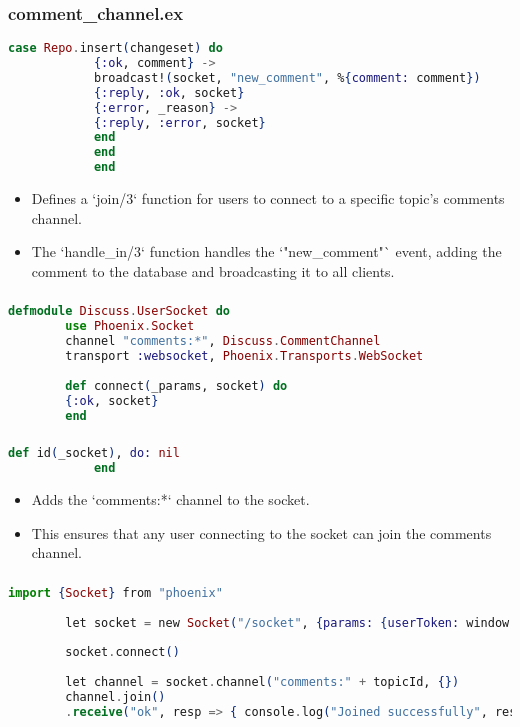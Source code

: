 \documentclass[aspectratio=169, table]{beamer}
\begin{document}
	\begin{frame}[fragile]
		\frametitle{comment\_channel.ex}
		\begin{lstlisting}[language=Elixir]
			case Repo.insert(changeset) do
			{:ok, comment} ->
			broadcast!(socket, "new_comment", %{comment: comment})
			{:reply, :ok, socket}
			{:error, _reason} ->
			{:reply, :error, socket}
			end
			end
			end
		\end{lstlisting}
		\begin{itemize}
			\item Defines a `join/3` function for users to connect to a specific topic's comments channel.
			\item The `handle\_in/3` function handles the `"new\_comment"` event, adding the comment to the database and broadcasting it to all clients.
		\end{itemize}
	\end{frame}
	
	\begin{frame}[fragile]
	\frametitle{}
	\begin{lstlisting}[language=Elixir]
		defmodule Discuss.UserSocket do
		use Phoenix.Socket
		channel "comments:*", Discuss.CommentChannel
		transport :websocket, Phoenix.Transports.WebSocket
		
		def connect(_params, socket) do
		{:ok, socket}
		end
	\end{lstlisting}
	\end{frame}
	
	\begin{frame}[fragile]
		\frametitle{}
		\begin{lstlisting}[language=Elixir]
			def id(_socket), do: nil
			end
		\end{lstlisting}
		\begin{itemize}
			\item Adds the `comments:*` channel to the socket.
			\item This ensures that any user connecting to the socket can join the comments channel.
		\end{itemize}
	\end{frame}
	
	\begin{frame}[fragile]
	\frametitle{}
	\begin{lstlisting}[language=Elixir]
		import {Socket} from "phoenix"
		
		let socket = new Socket("/socket", {params: {userToken: window.userToken}})
		
		socket.connect()
		
		let channel = socket.channel("comments:" + topicId, {})
		channel.join()
		.receive("ok", resp => { console.log("Joined successfully", resp) })
	\end{lstlisting}
	\end{frame}
	
\end{document}
